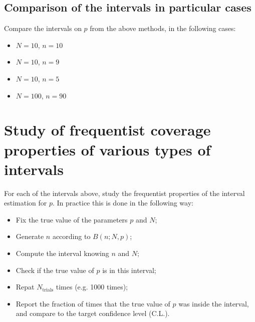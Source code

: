 \documentclass[a4paper,12pt]{article}
\begin{document}
\begin{enumerate}
 \end{enumerate}

 \subsection{Comparison of the intervals in particular cases}
 
 Compare the intervals on $p$ from the above methods, in the following cases:
 
 \begin{itemize}
 \item $N=10$, $n=10$
  \item $N=10$, $n=9$
  \item $N=10$, $n=5$
  \item $N=100$, $n=90$
 \end{itemize}

 
 \section{Study of frequentist coverage properties of various types of intervals}
 
 For each of the intervals above, study the frequentist properties of the interval estimation for $p$. In practice this is done in the following way:
 \begin{itemize}
  \item Fix the true value of the parameters $p$ and $N$;
  \item Generate $n$ according to $B(n;N,p)$;
  \item Compute the interval knowing $n$ and $N$;
  \item Check if the true value of $p$ is in this interval;
  \item Repat $N_\text{trials}$ times (e.g. 1000 times);
  \item Report the fraction of times that the true value of $p$ was inside the interval, and compare to the target confidence level (C.L.).
 \end{itemize}
\end{document}

